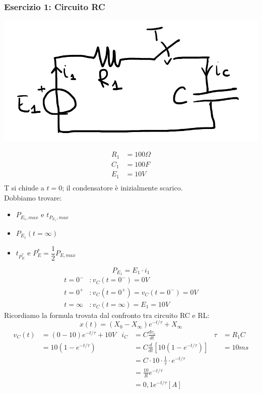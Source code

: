 \documentclass{article}
\begin{document}
\subsubsection{Esercizio 1: Circuito RC}
\begin{center}
    \includegraphics[scale=0.35]{Image/Es_1_Trans_1.png}
\end{center}
\begin{align*}
    R_1 &= 100 \Omega\\
    C_1 &= 100 F\\
    E_1 &= 10V\\
\end{align*}
T si chiude a $t=0$; il condensatore è inizialmente scarico.
\vspace*{0.1cm}\\
Dobbiamo trovare:
\begin{itemize}
    \item $P_{E_1,max}$ e $t_{P_{E_1}, max}$
    \item $P_{E_1}(t=\infty)$
    \item $t_{P_E^*}$ e $P_E^* = \dfrac{1}{2}P_{E,max}$
\end{itemize}
\[P_{E_1} = E_1 \cdot i_1\]
\begin{align*}
    t=0^- &: v_C(t=0^-) = 0V\\
    t=0^+ &: v_C(t=0^+) = v_C(t=0^-) = 0V\\
    t= \infty &: v_C(t = \infty) = E_1 = 10V
\end{align*}
Ricordiamo la formula trovata dal confronto tra circuito RC e RL:
\[x(t) = \left(X_0-X_{\infty}\right)e^{-t/\tau} + X_{\infty}\]
\begin{align*}
    v_C(t) &= (0-10)e^{-t/\tau} + 10V & i_C &= C\frac{dv_c}{dt} & \tau &= R_1C \\
    &= 10\left(1 - e^{-t/\tau}\right) & &=C \frac{d}{dt}\left[10 \left(1-e^{-t/\tau}\right)\right] & &=10ms\\
    & & &=C\cdot 10 \cdot \frac{1}{\tau} \cdot e^{-t/\tau}\\
    & & &=\frac{10}{R} e^{-t/\tau}\\
    & & &=0,1 e^{-t/\tau} [A]
\end{align*}
\end{document}
